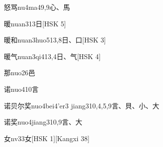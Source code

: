 \begin{EntryWithPhonetic}{怒骂}{nu4ma4}{9,9}{⼼、⾺}
\end{EntryWithPhonetic}

\begin{EntryWithPhonetic}{暖}{nuan3}{13}{⽇}[HSK 5]
\end{EntryWithPhonetic}

\begin{EntryWithPhonetic}{暖和}{nuan3huo5}{13,8}{⽇、⼝}[HSK 3]
\end{EntryWithPhonetic}

\begin{EntryWithPhonetic}{暖气}{nuan3qi4}{13,4}{⽇、⽓}[HSK 4]
\end{EntryWithPhonetic}

\begin{EntryWithPhonetic}{那}{nuo2}{6}{⾢}
\end{EntryWithPhonetic}

\begin{EntryWithPhonetic}{诺}{nuo4}{10}{⾔}
\end{EntryWithPhonetic}

\begin{EntryWithPhonetic}{诺贝尔奖}{nuo4bei4'er3 jiang3}{10,4,5,9}{⾔、⾙、⼩、⼤}
\end{EntryWithPhonetic}

\begin{EntryWithPhonetic}{诺奖}{nuo4jiang3}{10,9}{⾔、⼤}
\end{EntryWithPhonetic}

\begin{EntryWithPhonetic}{女}{nv3}{3}{⼥}[HSK 1][Kangxi 38]
\end{EntryWithPhonetic}

